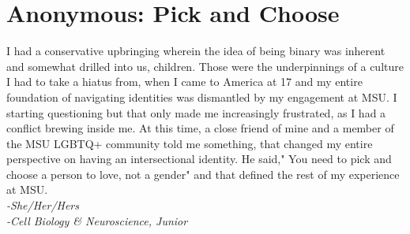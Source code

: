 \section*{Anonymous: Pick and Choose}
I had a conservative upbringing wherein the idea of being binary was inherent
and somewhat drilled into us, children. Those were the underpinnings of a 
culture I had to take a hiatus from, when I came to America at 17 and my entire 
foundation of navigating identities was dismantled by my engagement at MSU. I 
starting questioning but that only made me increasingly frustrated, as I had a 
conflict brewing inside me. At this time, a close friend of mine and a member 
of the MSU LGBTQ+ community told me something, that changed my entire 
perspective on having an intersectional identity. He said," You need to pick 
and choose a person to love, not a gender" and that defined the rest of my 
experience at MSU.
 \\
\textit{-She/Her/Hers}\\
\textit{-Cell Biology \& Neuroscience, Junior}\\

